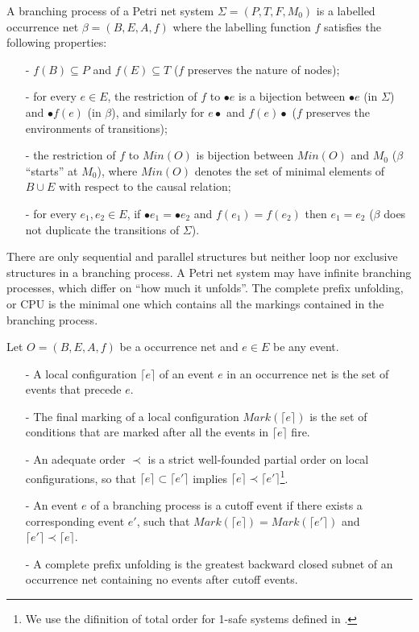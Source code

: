 \documentclass{llncs}
\begin{document}
\begin{definition}\label{def:branchingProcess}
A branching process of a Petri net system $\Sigma=(P,T,F,M_{0})$ is a labelled occurrence net $\beta=(B,E,A,f)$ where the labelling function $f$ satisfies the following properties:
	\begin{itemize}
		\item[-] $f(B)\subseteq P$ and $f(E)\subseteq T$ ($f$ preserves the nature of nodes);
		\item[-] for every $e\in E$, the restriction of $f$ to $\bullet e$ is a bijection between $\bullet e$ (in $\Sigma$) and $\bullet f(e)$ (in $\beta$), and similarly for $e\bullet$ and $f(e)\bullet$ ($f$ preserves the environments of transitions);
		\item[-] the restriction of $f$ to $Min(O)$ is bijection between $Min(O)$ and $M_{0}$ ($\beta$ ``starts'' at $M_{0}$), where $Min(O)$ denotes the set of minimal elements of $B\cup E$ with respect to the causal relation;
		\item[-] for every $e_{1},e_{2}\in E$, if $\bullet e_{1}=\bullet e_{2}$ and $f(e_{1})=f(e_{2})$ then $e_{1}=e_{2}$ ($\beta$ does not duplicate the transitions of $\Sigma$).
	\end{itemize}
\end{definition}

There are only sequential and parallel structures but neither loop nor exclusive structures in a branching process. A Petri net system may have infinite branching processes, which differ on ``how much it unfolds''. The complete prefix unfolding, or CPU is the minimal one which contains all the markings contained in the branching process.

\begin{definition}\label{def:cpu}
Let $O=(B,E,A,f)$ be a occurrence net and $e\in E$ be any event.
	\begin{itemize}
		\item[-] A local configuration $\lceil e\rceil$ of an event $e$ in an occurrence net is the set of events that precede $e$.
		\item[-] The final marking of a local configuration $Mark(\lceil e\rceil)$ is the set of conditions that are marked after all the events in $\lceil e\rceil$ fire.
		\item[-] An adequate order $\prec$ is a strict well-founded partial order on local configurations, so that $\lceil e\rceil\subset\lceil e'\rceil$ implies $\lceil e\rceil\prec\lceil e'\rceil$\footnote{We use the difinition of total order for 1-safe systems defined in \cite{esparza1996improvement}.}.
		\item[-] An event $e$ of a branching process is a cutoff event if there exists a corresponding event $e'$, such that $Mark(\lceil e\rceil)=Mark(\lceil e'\rceil)$ and $\lceil e'\rceil\prec\lceil e\rceil$.
		\item[-] A complete prefix unfolding is the greatest backward closed subnet of an occurrence net containing no events after cutoff events.
	\end{itemize}
\end{definition}
\end{document}
